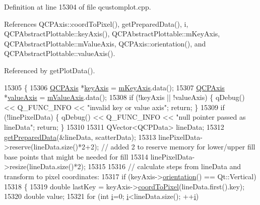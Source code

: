 Definition at line 15304 of file qcustomplot.\+cpp.



References Q\+C\+P\+Axis\+::coord\+To\+Pixel(), get\+Prepared\+Data(), i, Q\+C\+P\+Abstract\+Plottable\+::key\+Axis(), Q\+C\+P\+Abstract\+Plottable\+::m\+Key\+Axis, Q\+C\+P\+Abstract\+Plottable\+::m\+Value\+Axis, Q\+C\+P\+Axis\+::orientation(), and Q\+C\+P\+Abstract\+Plottable\+::value\+Axis().



Referenced by get\+Plot\+Data().


\begin{DoxyCode}
15305 \{
15306   \hyperlink{class_q_c_p_axis}{QCPAxis} *\hyperlink{class_q_c_p_abstract_plottable_a72c7a09c22963f2c943f07112b311103}{keyAxis} = \hyperlink{class_q_c_p_abstract_plottable_a426f42e254d0f8ce5436a868c61a6827}{mKeyAxis}.data();
15307   \hyperlink{class_q_c_p_axis}{QCPAxis} *\hyperlink{class_q_c_p_abstract_plottable_a3106f9d34d330a6097a8ec5905e5b519}{valueAxis} = \hyperlink{class_q_c_p_abstract_plottable_a2901452ca4aea911a1827717934a4bda}{mValueAxis}.data();
15308   \textcolor{keywordflow}{if} (!keyAxis || !valueAxis) \{ qDebug() << Q\_FUNC\_INFO << \textcolor{stringliteral}{"invalid key or value axis"}; \textcolor{keywordflow}{return}; \}
15309   \textcolor{keywordflow}{if} (!linePixelData) \{ qDebug() << Q\_FUNC\_INFO << \textcolor{stringliteral}{"null pointer passed as lineData"}; \textcolor{keywordflow}{return}; \}
15310   
15311   QVector<QCPData> lineData;
15312   \hyperlink{class_q_c_p_graph_ab420b46ba638dc3252439fe16687b244}{getPreparedData}(&lineData, scatterData);
15313   linePixelData->reserve(lineData.size()*2+2); \textcolor{comment}{// added 2 to reserve memory for lower/upper fill base
       points that might be needed for fill}
15314   linePixelData->resize(lineData.size()*2);
15315   
15316   \textcolor{comment}{// calculate steps from lineData and transform to pixel coordinates:}
15317   \textcolor{keywordflow}{if} (keyAxis->\hyperlink{class_q_c_p_axis_a57483f2f60145ddc9e63f3af53959265}{orientation}() == Qt::Vertical)
15318   \{
15319     \textcolor{keywordtype}{double} lastKey = keyAxis->\hyperlink{class_q_c_p_axis_a985ae693b842fb0422b4390fe36d299a}{coordToPixel}(lineData.first().key);
15320     \textcolor{keywordtype}{double} value;
15321     \textcolor{keywordflow}{for} (\textcolor{keywordtype}{int} \hyperlink{_comparision_pictures_2_createtest_image_8m_a6f6ccfcf58b31cb6412107d9d5281426}{i}=0; \hyperlink{_comparision_pictures_2_createtest_image_8m_a6f6ccfcf58b31cb6412107d9d5281426}{i}<lineData.size(); ++\hyperlink{_comparision_pictures_2_createtest_image_8m_a6f6ccfcf58b31cb6412107d9d5281426}{i})

\end{DoxyCode}
